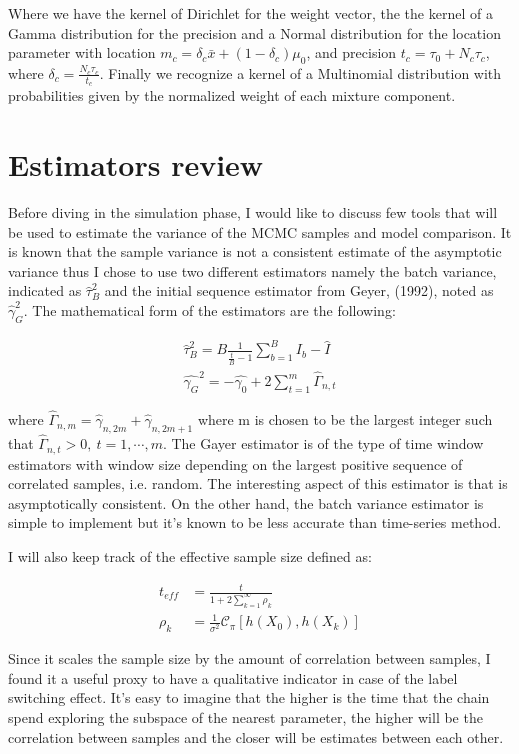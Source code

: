 \documentclass{article}
\begin{document}
Where we have the kernel of Dirichlet for the weight vector, the the kernel of a Gamma distribution for the precision and a Normal distribution for the location parameter with location \newline $m_c = \delta_c \bar{x} + (1-\delta_c) \mu_0$, and precision $t_c = \tau_0 + N_c \tau_c$, where $\delta_c = \frac{N_c\tau_c}{t_c}$. Finally we recognize a kernel of a Multinomial distribution with probabilities given by the normalized weight of each mixture component.

\section{Estimators review}
Before diving in the simulation phase, I would like to discuss few tools that will be used to estimate the variance of the MCMC samples and model comparison. It is known that the sample variance is not a consistent estimate of the asymptotic variance thus I chose to use two different estimators namely the batch variance, indicated as $\hat{\tau}_B^2$ and the initial sequence estimator from Geyer, (1992), noted as $\hat{\gamma}^2_G$. The mathematical form of the estimators are the following:

\begin{align*}
\hat{\tau}^2_B = B \frac{1}{\frac{t}{B} - 1} \sum_{b=1}^B I_b - \hat{I}  \\
\hat{\gamma_G}^2 = - \hat{\gamma_0} + 2 \sum_{t=1}^m \hat{\Gamma}_{n,t}
\end{align*}

where $\hat{\Gamma}_{n,m}=  \hat{\gamma}_{n,2m} + \hat{\gamma}_{n,2m+1}$ where m is chosen to be the largest integer such that $\hat{\Gamma}_{n,t}>0, \ t = 1, \cdots, m$. The Gayer estimator is of the type of time window estimators with window size depending on the largest positive sequence of correlated samples, i.e. random. The interesting aspect of this estimator is that is asymptotically consistent. On the other hand, the batch variance estimator is simple to implement but it's known to be less accurate than time-series method.

I will also keep track of the effective sample size defined as:

\begin{align*}
t_{eff} &= \frac{t}{1+2\sum_{k=1}^\infty \rho_k} \\
\rho_k & =  \frac{1}{\sigma^2}\mathcal{C}_\pi [h(X_0), h(X_k)]
\end{align*}

Since it scales the sample size by the amount of correlation between samples, I found it a useful proxy to have a qualitative indicator in case of the label switching effect. It's easy to imagine that the higher is the time that the chain spend exploring the subspace of the nearest parameter, the higher will be the correlation between samples and the closer will be estimates between each other.
\end{document}
